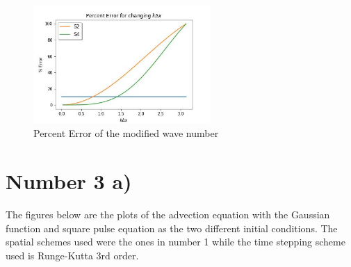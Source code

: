 \documentclass{article}
\begin{document}
	\begin{figure}[H]
		\centering
		\includegraphics[width=0.6\textwidth]{error.jpg}
		\caption{\label{} Percent Error of the modified wave number }
	\end{figure}

	\section*{Number 3 a)}
	The figures below are the plots of the advection equation with the Gaussian function and square pulse equation as the two different initial conditions. The spatial schemes used were the ones in number 1 while the time stepping scheme used is Runge-Kutta 3rd order. 
	
\end{document}
